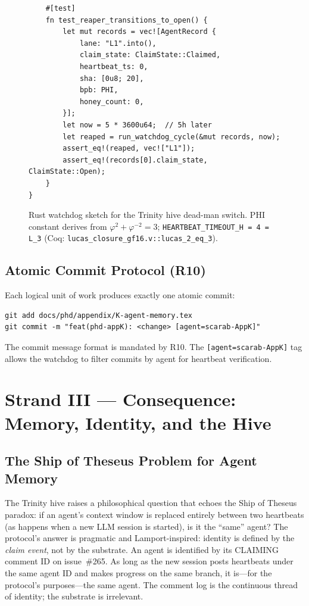 \begin{figure}[H]
\begin{verbatim}
    #[test]
    fn test_reaper_transitions_to_open() {
        let mut records = vec![AgentRecord {
            lane: "L1".into(),
            claim_state: ClaimState::Claimed,
            heartbeat_ts: 0,
            sha: [0u8; 20],
            bpb: PHI,
            honey_count: 0,
        }];
        let now = 5 * 3600u64;  // 5h later
        let reaped = run_watchdog_cycle(&mut records, now);
        assert_eq!(reaped, vec!["L1"]);
        assert_eq!(records[0].claim_state, ClaimState::Open);
    }
}
\end{verbatim}
\caption{Rust watchdog sketch for the Trinity hive dead-man switch.
  PHI constant derives from $\varphi^2 + \varphi^{-2} = 3$;
  \texttt{HEARTBEAT\_TIMEOUT\_H = 4 = L\_3}
  (Coq: \texttt{lucas\_closure\_gf16.v::lucas\_2\_eq\_3}).}
\label{fig:K-reaper-rust}
\end{figure}

\subsection{Atomic Commit Protocol (R10)}
\label{ssec:K-r10-commits}

Each logical unit of work produces exactly one atomic commit:

\begin{verbatim}
git add docs/phd/appendix/K-agent-memory.tex
git commit -m "feat(phd-appK): <change> [agent=scarab-AppK]"
\end{verbatim}

The commit message format is mandated by R10. The
\texttt{[agent=scarab-AppK]} tag allows the watchdog to filter commits
by agent for heartbeat verification.


\section{Strand III --- Consequence: Memory, Identity, and the Hive}
\label{sec:K-consequence}

\subsection{The Ship of Theseus Problem for Agent Memory}
\label{ssec:K-theseus}

The Trinity hive raises a philosophical question that echoes the Ship
of Theseus paradox: if an agent's context window is replaced entirely
between two heartbeats (as happens when a new LLM session is started),
is it the ``same'' agent? The protocol's answer is pragmatic and
Lamport-inspired: identity is defined by the \emph{claim event}, not
by the substrate. An agent is identified by its CLAIMING comment ID on
issue~\#265. As long as the new session posts heartbeats under the same
agent ID and makes progress on the same branch, it is---for the
protocol's purposes---the same agent. The comment log is the
continuous thread of identity; the substrate is irrelevant.

